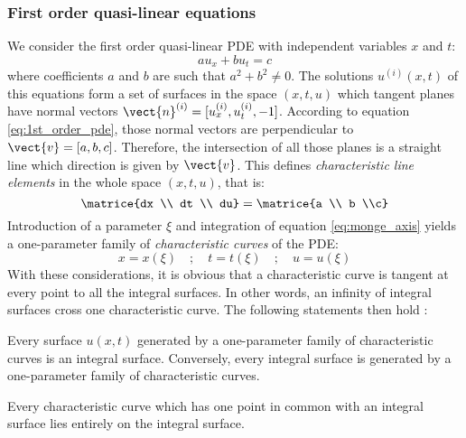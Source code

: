 \subsubsection*{First order quasi-linear equations}
We consider the first order quasi-linear PDE with independent variables $x$ and $t$:
\begin{equation}
  \label{eq:1st_order_pde}
   a u_x + b u_t  = c
\end{equation}
where coefficients $a$ and $b$ are such that $a^2 + b^2 \neq 0$. The solutions $u^{(i)}(x,t)$ of this equations form a set of surfaces in the space $(x,t,u)$ which tangent planes have normal vectors $\vect{n}^{(i)}=[u^{(i)}_x,u^{(i)}_t,-1]$. According to equation \ref{eq:1st_order_pde}, those normal vectors are perpendicular to $\vect{v}=[a,b,c]$. Therefore, the intersection of all those planes is a straight line which direction is given by $\vect{v}$. This defines \textit{characteristic line elements} in the whole space $(x,t,u)$, that is:
\begin{equation}
  \label{eq:monge_axis}
  \matrice{dx \\ dt \\ du} = \matrice{a \\ b \\c}
\end{equation}
Introduction of a parameter $\xi$ and integration of equation \ref{eq:monge_axis} yields a one-parameter family of \textit{characteristic curves} of the PDE:
\begin{equation*}
  x=x(\xi) \quad ; \quad t=t(\xi) \quad ; \quad u=u(\xi)
\end{equation*}
With these considerations, it is obvious that a characteristic curve is tangent at every point to all the integral surfaces. In other words, an infinity of integral surfaces cross one characteristic curve. The following statements then hold \cite[p.63-64]{Courant}:
\begin{theorem}
  \label{th:integral_surface_generated}
  Every surface $u(x,t)$ generated by a one-parameter family of characteristic curves is an integral surface. Conversely, every integral surface is generated by a one-parameter family of characteristic curves.
\end{theorem}
\begin{theorem}
  \label{th:charac_in_integral_surface}
  Every characteristic curve which has one point in common with an integral surface lies entirely on the integral surface.
\end{theorem}

